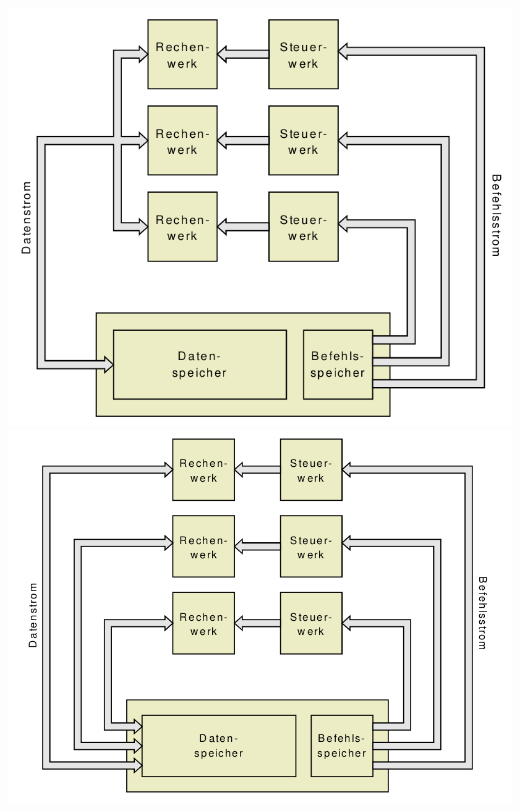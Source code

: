 \documentclass[10pt,landscape]{article}
\begin{document}
\begin{multicols}{3}
\begin{center}
    \includegraphics[width=\textwidth/13]{Assets/RA2_MISD.png}
    \includegraphics[width=\textwidth/13]{Assets/RA2_MIMD.png}
  \end{center}
    
  
  

\end{multicols}
\end{document}
